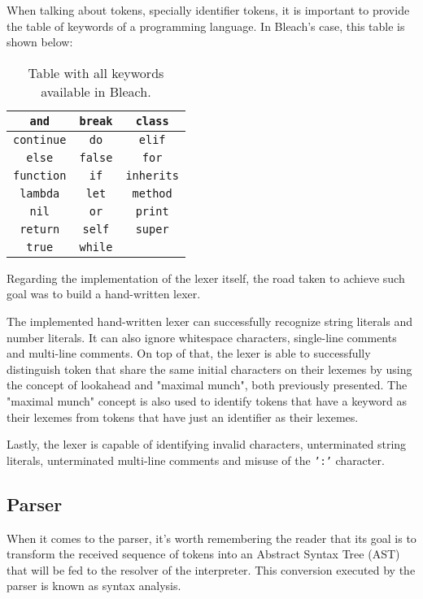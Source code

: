 When talking about tokens, specially identifier tokens, it is important to provide the table of keywords of a programming language. In Bleach's case, this table is shown below:
\begin{table}[H]
    \centering
    \begin{tabular}{|c|c|c|}
    \hline
    \texttt{and} & \texttt{break} & \texttt{class}  \\ \hline
    \texttt{continue} & \texttt{do} & \texttt{elif}  \\ \hline
    \texttt{else} & \texttt{false} & \texttt{for}  \\ \hline
    \texttt{function} & \texttt{if} & \texttt{inherits} \\ \hline
    \texttt{lambda} & \texttt{let} & \texttt{method} \\ \hline
    \texttt{nil} & \texttt{or} & \texttt{print} \\ \hline
    \texttt{return} & \texttt{self} & \texttt{super} \\ \hline
    \texttt{true} & \texttt{while} &  \\ \hline
    \end{tabular}
    \caption{Table with all keywords available in Bleach.}
\end{table}

Regarding the implementation of the lexer itself, the road taken to achieve such goal was to build a hand-written lexer.

The implemented hand-written lexer can successfully recognize string literals and number literals. It can also ignore whitespace characters, single-line comments and multi-line comments. On top of that, the lexer is able to successfully distinguish token that share the same initial characters on their lexemes by using the concept of lookahead and "maximal munch", both previously presented. The "maximal munch" concept is also used to identify tokens that have a keyword as their lexemes from tokens that have just an identifier as their lexemes. 

Lastly, the lexer is capable of identifying invalid characters, unterminated string literals, unterminated multi-line comments and misuse of the \texttt{':'} character.

\subsection{Parser}
When it comes to the parser, it's worth remembering the reader that its goal is to transform the received sequence of tokens into an Abstract Syntax Tree (AST) that will be fed to the resolver of the interpreter. This conversion executed by the parser is known as syntax analysis.

